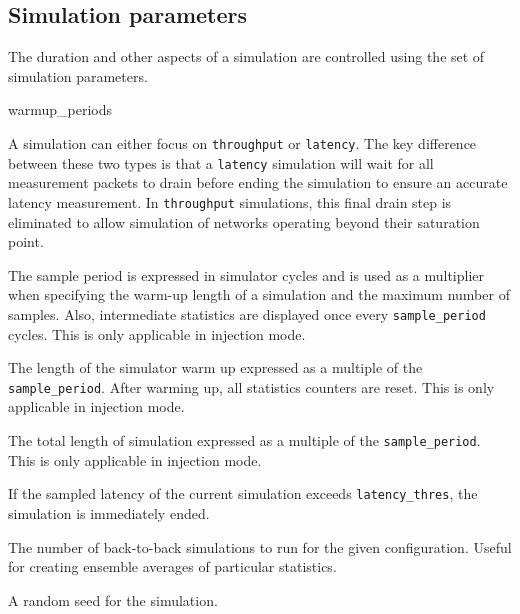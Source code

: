 \documentclass[11pt]{article}
\begin{document}
\subsection{Simulation parameters}
\label{sec:sim_params}

The duration and other aspects of a simulation are controlled using
the set of simulation parameters.

\begin{opt_list}{warmup\_periods}

\item[sim\_type] A simulation can either focus on
\texttt{throughput} or \texttt{latency}.  The key difference between
these two types is that a \texttt{latency} simulation will wait for
all measurement packets to drain before ending the simulation to
ensure an accurate latency measurement.  In \texttt{throughput}
simulations, this final drain step is eliminated to allow simulation
of networks operating beyond their saturation point.

\item[sample\_period] The sample period is expressed in simulator
cycles and is used as a multiplier when specifying the warm-up length
of a simulation and the maximum number of samples.  Also, intermediate
statistics are displayed once every \texttt{sample\_period} cycles. This is only applicable in injection mode.

\item[warmup\_periods] The length of the simulator warm up expressed
as a multiple of the \texttt{sample\_period}.  After warming up, all
statistics counters are reset. This is only applicable in injection mode.

\item[max\_samples] The total length of simulation expressed as a
multiple of the \texttt{sample\_period}. This is only applicable in injection mode.

\item[latency\_thres] If the sampled latency of the current simulation
exceeds \texttt{latency\_thres}, the simulation is immediately ended.

\item[sim\_count] The number of back-to-back simulations to run for the
given configuration.  Useful for creating ensemble averages of
particular statistics.

\item[seed] A random seed for the simulation.



\end{opt_list}
\end{document}
